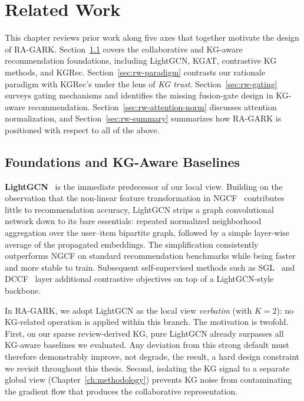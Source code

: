 \chapter{Related Work}
\label{ch:relatedwork}

This chapter reviews prior work along five axes that together motivate the design of RA-GARK. Section~\ref{sec:rw-foundations} covers the collaborative and KG-aware recommendation foundations, including LightGCN, KGAT, contrastive KG methods, and KGRec. Section~\ref{sec:rw-paradigm} contrasts our rationale paradigm with KGRec's under the lens of \emph{KG trust}. Section~\ref{sec:rw-gating} surveys gating mechanisms and identifies the missing fusion-gate design in KG-aware recommendation. Section~\ref{sec:rw-attention-norm} discusses attention normalization, and Section~\ref{sec:rw-summary} summarizes how RA-GARK is positioned with respect to all of the above.

\section{Foundations and KG-Aware Baselines}
\label{sec:rw-foundations}

\textbf{LightGCN}~\cite{he2020lightgcn} is the immediate predecessor of our local view. Building on the observation that the non-linear feature transformation in NGCF~\cite{wang2019ngcf} contributes little to recommendation accuracy, LightGCN strips a graph convolutional network down to its bare essentials: repeated normalized neighborhood aggregation over the user--item bipartite graph, followed by a simple layer-wise average of the propagated embeddings. The simplification consistently outperforms NGCF on standard recommendation benchmarks while being faster and more stable to train. Subsequent self-supervised methods such as SGL~\cite{wu2021sgl} and DCCF~\cite{ren2023dccf} layer additional contrastive objectives on top of a LightGCN-style backbone.

In RA-GARK, we adopt LightGCN as the local view \emph{verbatim} (with $K=2$): no KG-related operation is applied within this branch. The motivation is twofold. First, on our sparse review-derived KG, pure LightGCN already surpasses all KG-aware baselines we evaluated. Any deviation from this strong default must therefore demonstrably improve, not degrade, the result, a hard design constraint we revisit throughout this thesis. Second, isolating the KG signal to a separate global view (Chapter~\ref{ch:methodology}) prevents KG noise from contaminating the gradient flow that produces the collaborative representation.

